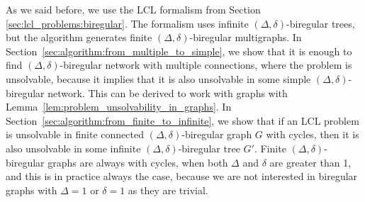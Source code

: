 As we said before, we use the LCL formalism from Section \ref{sec:lcl_problems:biregular}.
The formalism uses infinite $(\Delta, \delta)$-biregular trees, but the algorithm generates finite $(\Delta, \delta)$-biregular multigraphs.
In Section~\ref{sec:algorithm:from_multiple_to_simple}, we show that it is enough to find $(\Delta, \delta)$-biregular network with multiple connections, where the problem is unsolvable, because it implies that it is also unsolvable in some simple $(\Delta, \delta)$-biregular network.
This can be derived to work with graphs with Lemma~\ref{lem:problem_unsolvability_in_graphs}.
In Section~\ref{sec:algorithm:from_finite_to_infinite}, we show that if an LCL problem is unsolvable in finite connected $(\Delta, \delta)$-biregular graph $G$ with cycles, then it is also unsolvable in some infinite $(\Delta, \delta)$-biregular tree $G'$.
Finite $(\Delta, \delta)$-biregular graphs are always with cycles, when both $\Delta$ and $\delta$ are greater than 1, and this is in practice always the case, because we are not interested in biregular graphs with $\Delta=1$ or $\delta=1$ as they are trivial.





